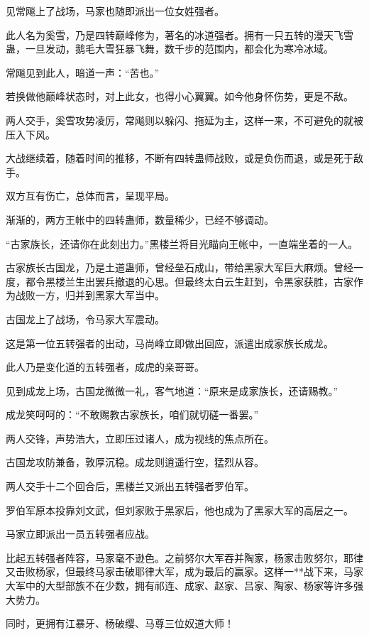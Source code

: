 
\begin{this_body}

见常飚上了战场，马家也随即派出一位女姓强者。

此人名为奚雪，乃是四转巅峰修为，著名的冰道强者。拥有一只五转的漫天飞雪蛊，一旦发动，鹅毛大雪狂暴飞舞，数千步的范围内，都会化为寒冷冰域。

常飚见到此人，暗道一声：“苦也。”

若换做他巅峰状态时，对上此女，也得小心翼翼。如今他身怀伤势，更是不敌。

两人交手，奚雪攻势凌厉，常飚则以躲闪、拖延为主，这样一来，不可避免的就被压入下风。

大战继续着，随着时间的推移，不断有四转蛊师战败，或是负伤而退，或是死于敌手。

双方互有伤亡，总体而言，呈现平局。

渐渐的，两方王帐中的四转蛊师，数量稀少，已经不够调动。

“古家族长，还请你在此刻出力。”黑楼兰将目光瞄向王帐中，一直端坐着的一人。

古家族长古国龙，乃是土道蛊师，曾经垒石成山，带给黑家大军巨大麻烦。曾经一度，都令黑楼兰生出罢兵撤退的心思。但最终太白云生赶到，令黑家获胜，古家作为战败一方，归并到黑家大军当中。

古国龙上了战场，令马家大军震动。

这是第一位五转强者的出动，马尚峰立即做出回应，派遣出成家族长成龙。

此人乃是变化道的五转强者，成虎的亲哥哥。

见到成龙上场，古国龙微微一礼，客气地道：“原来是成家族长，还请赐教。”

成龙笑呵呵的：“不敢赐教古家族长，咱们就切磋一番罢。”

两人交锋，声势浩大，立即压过诸人，成为视线的焦点所在。

古国龙攻防兼备，敦厚沉稳。成龙则逍遥行空，猛烈从容。

两人交手十二个回合后，黑楼兰又派出五转强者罗伯军。

罗伯军原本投靠刘文武，但刘家败于黑家后，他也成为了黑家大军的高层之一。

马家立即派出一员五转强者应战。

比起五转强者阵容，马家毫不逊色。之前努尔大军吞并陶家，杨家击败努尔，耶律又击败杨家，但最终马家击破耶律大军，成为最后的赢家。这样一**战下来，马家大军中的大型部族不在少数，拥有祁连、成家、赵家、吕家、陶家、杨家等许多强大势力。

同时，更拥有江暴牙、杨破缨、马尊三位奴道大师！


\end{this_body}
